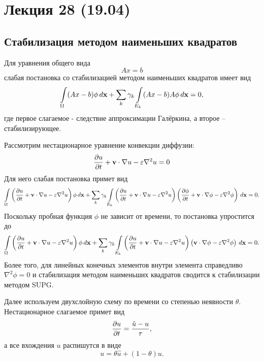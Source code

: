 \section{Лекция 28 (19.04)}

\subsection{Стабилизация методом наименьших квадратов}

Для уравнения общего вида
\begin{equation*}
A x = b
\end{equation*}
слабая постановка со стабилизацией методом наименьших квадратов 
имеет вид
\begin{equation*}
\feint{(Ax - b)\phi} + \sum_k \gamma_k\arint{(Ax-b)A\phi}{E_k}{\vec x} = 0,
\end{equation*}
где первое слагаемое - следствие аппроксимации Галёркина, а второе -- стабилизирующее.

Рассмотрим нестационарное уравнение конвекции диффузии:
\begin{equation*}
\dfr{u}{t} + \vec v\cdot \nabla u - \eps \nabla^2 u = 0
\end{equation*}
Для него слабая постановка примет вид
\begin{equation*}
\feint{
\left(
\dfr{u}{t} + \vec v\cdot \nabla u - \eps \nabla^2 u
\right)\phi} +
\sum_k \gamma_k\arint{\left(
\dfr{u}{t} + \vec v\cdot \nabla u - \eps \nabla^2 u
\right)\left(
\dfr{\phi}{t} + \vec v\cdot \nabla \phi - \eps \nabla^2 \phi
\right)}{E_k}{\vec x} = 0.
\end{equation*}
Поскольку пробная функция $\phi$ не зависит от времени, то постановка упростится до
\begin{equation*}
\feint{
\left(
\dfr{u}{t} + \vec v\cdot \nabla u - \eps \nabla^2 u
\right)\phi} +
\sum_k \gamma_k\arint{\left(
\dfr{u}{t} + \vec v\cdot \nabla u - \eps \nabla^2 u
\right)\left(
\vec v\cdot \nabla \phi - \eps \nabla^2 \phi
\right)}{E_k}{\vec x} = 0.
\end{equation*}
Более того, для линейных конечных элементов внутри элемента справедливо $\nabla^2 \phi = 0$ и
стабилизация методом наименьших квадратов сводится к стабилизации методом SUPG.

Далее используем двухслойную схему по времени со степенью неявности $\theta$.
Нестационарное слагаемое примет вид
\begin{equation*}
\dfr{u}{t} = \frac{\hat u - u}{\tau}, 
\end{equation*}
а все вхождения $u$ распишутся в виде
\begin{equation*}
u = \theta \hat u + (1 - \theta ) u.
\end{equation*}

